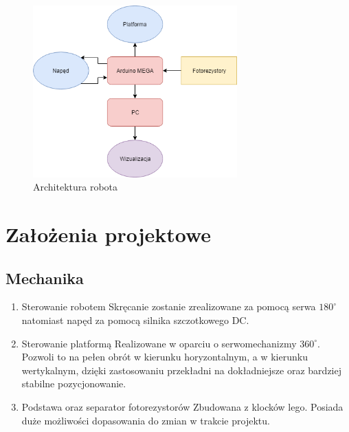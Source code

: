 \documentclass[10pt, a4paper]{article}
\begin{document}
	\begin{figure}[H]
		\centering
		\includegraphics[width=0.7\textwidth]{diag3.png}
		\caption{Architektura robota}
		\label{fig:Architektura robota}
	\end{figure}

\section{Założenia projektowe}

\subsection{Mechanika}
\begin{enumerate}
	\item Sterowanie robotem
	\newline
	Skręcanie zostanie zrealizowane za pomocą serwa $180^\circ$ natomiast napęd za pomocą silnika szczotkowego DC.
	
	\item Sterowanie platformą
	\newline
	Realizowane w oparciu o serwomechanizmy $360^\circ$. Pozwoli to na pełen obrót w kierunku horyzontalnym, a w kierunku wertykalnym, dzięki zastosowaniu przekładni na dokładniejsze oraz bardziej stabilne pozycjonowanie.
	
	\item Podstawa oraz separator fotorezystorów
	\newline
	Zbudowana z klocków lego. Posiada duże możliwości dopasowania do zmian w trakcie projektu.
	
\end{enumerate}
\end{document}

